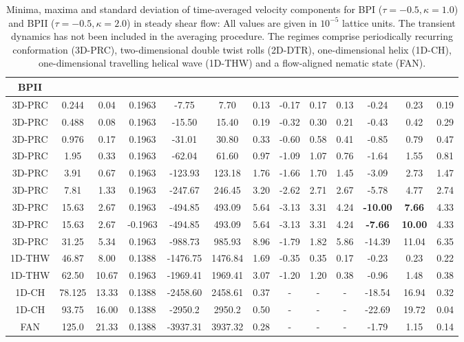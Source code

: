 \documentclass[aps,pre,reprint,superscriptaddress, twocolumn]{revtex4}
\begin{document}
\begin{table}[htpb]
\begin{tabular}{|c||c|| c || c || c |c |c||c| c| c||c| c| c|}
BPII \\
\hline
3D-PRC & 0.244 &0.04 & 0.1963 &-7.75 &7.70 &0.13 &-0.17 &0.17 &0.13 &-0.24 &0.23 &0.19 \\
3D-PRC & 0.488 &0.08 & 0.1963 &-15.50 &15.40 &0.19 &-0.32 &0.30 &0.21 &-0.43 &0.42 &0.29 \\
3D-PRC & 0.976 &0.17 & 0.1963 &-31.01 &30.80 &0.33 &-0.60 &0.58 &0.41 &-0.85 &0.79 &0.47 \\
3D-PRC & 1.95 &0.33  & 0.1963 &-62.04  &61.60 & 0.97 & -1.09 &1.07 & 0.76 & -1.64 & 1.55 & 0.81\\
3D-PRC &3.91 & 0.67& 0.1963 &-123.93 &123.18 & 1.76 &-1.66 &1.70 & 1.45 &-3.09& 2.73 &1.47\\
3D-PRC &7.81 &1.33 & 0.1963  &-247.67 &246.45 & 3.20 &-2.62 &2.71 & 2.67 &-5.78 & 4.77 &2.74\\
3D-PRC &15.63 & 2.67& 0.1963 &-494.85 &493.09 & 5.64 &-3.13 &3.31 &4.24 &\bf{-10.00} & \bf{7.66} &4.33\\
3D-PRC & 15.63 & 2.67& -0.1963&-494.85 &493.09 & 5.64 & -3.13 &3.31 &4.24 &\bf{-7.66} & \bf{10.00} &4.33\\
3D-PRC & 31.25 &5.34 & 0.1963 &-988.73 &985.93 &8.96  &-1.79 &1.82 &5.86 &-14.39 & 11.04 &6.35\\
\hline
1D-THW & 46.87 &8.00 & 0.1388 & -1476.75 & 1476.84 &1.69 &-0.35  &0.35  & 0.17 &-0.23 &0.23  & 0.22\\
1D-THW & 62.50 & 10.67& 0.1963 & -1969.41  & 1969.41 & 3.07 & -1.20 & 1.20 & 0.38 &-0.96 & 1.48 &0.38 \\
\hline
1D-CH & 78.125 & 13.33 &  0.1388 &-2458.60 & 2458.61  &0.37 &- &- &- &-18.54 &16.94 &0.32 \\
1D-CH & 93.75 &16.00 & 0.1388 &-2950.2  &2950.2 &0.50 &- &- &- &-22.69 & 19.72 & 0.04\\
\hline
FAN & 125.0 &21.33 & 0.1388 &-3937.31  & 3937.32 &0.28 &-  &-  &-  &-1.79 &1.15  &0.14 \\
\hline
\end{tabular}
\caption{Minima, maxima and standard deviation of time-averaged velocity components 
for BPI ($\tau=-0.5, \kappa=1.0$) and BPII ($\tau=-0.5, \kappa=2.0$) in steady 
shear flow: All values are given in $10^{-5}$ lattice units. The transient dynamics 
has not been included in the averaging procedure. The regimes comprise periodically 
recurring conformation (3D-PRC), two-dimensional double twist rolls (2D-DTR), 
one-dimensional helix (1D-CH), one-dimensional travelling helical wave (1D-THW) 
and a flow-aligned nematic state (FAN).}
\label{tab1}
\end{table}
\end{document}
